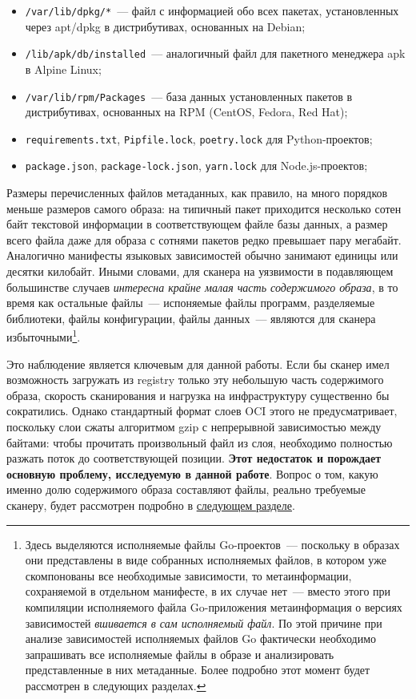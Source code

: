 \begin{itemize}
\item \texttt{/var/lib/dpkg/*}~--- файл с информацией обо всех пакетах, установленных через apt/dpkg в дистрибутивах, основанных на Debian;
\item \texttt{/lib/apk/db/installed}~--- аналогичный файл для пакетного менеджера apk в Alpine Linux;
\item \texttt{/var/lib/rpm/Packages}~--- база данных установленных пакетов в дистрибутивах, основанных на RPM (CentOS, Fedora, Red Hat);
\item \texttt{requirements.txt}, \texttt{Pipfile.lock}, \texttt{poetry.lock} для Python-проектов;
\item \texttt{package.json}, \texttt{package-lock.json}, \texttt{yarn.lock} для Node.js-проектов;
\end{itemize}

Размеры перечисленных файлов метаданных, как правило, на много порядков меньше размеров самого образа: на типичный пакет приходится несколько сотен байт текстовой информации в соответствующем файле базы данных, а размер всего файла даже для образа с сотнями пакетов редко превышает пару мегабайт. Аналогично манифесты языковых зависимостей обычно занимают единицы или десятки килобайт. Иными словами, для сканера на уязвимости в подавляющем большинстве случаев \textit{интересна крайне малая часть содержимого образа}, в то время как остальные файлы~--- испоняемые файлы программ, разделяемые библиотеки, файлы конфигурации, файлы данных~--- являются для сканера избыточными\footnote{Здесь выделяются исполняемые файлы Go-проектов~--- поскольку в образах они представлены в виде собранных исполняемых файлов, в котором уже скомпонованы все необходимые зависимости, то метаинформации, сохраняемой в отдельном манифесте, в их случае нет~--- вместо этого при компиляции исполняемого файла Go-приложения метаинформация о версиях зависимостей \textit{вшивается в сам исполняемый файл}. По этой причине при анализе зависимостей исполняемых файлов Go фактически необходимо запрашивать все исполняемые файлы в образе и анализировать представленные в них метаданные. Более подробно этот момент будет рассмотрен в следующих разделах.}.

Это наблюдение является ключевым для данной работы. Если бы сканер имел возможность загружать из registry только эту небольшую часть содержимого образа, скорость сканирования и нагрузка на инфраструктуру существенно бы сократились. Однако стандартный формат слоев OCI этого не предусматривает, поскольку слои сжаты алгоритмом gzip с непрерывной зависимостью между байтами: чтобы прочитать произвольный файл из слоя, необходимо полностью разжать поток до соответствующей позиции. \textbf{Этот недостаток и порождает основную проблему, исследуемую в данной работе}. Вопрос о том, какую именно долю содержимого образа составляют файлы, реально требуемые сканеру, будет рассмотрен подробно в \hyperref[sec:Chapter3]{следующем разделе}.

\newpage
